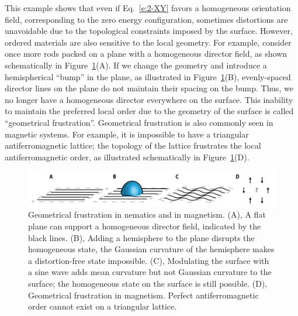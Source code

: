 This example shows that even if Eq.~\ref{e:2-XY} favors a homogeneous orientation field, corresponding to the zero energy configuration, sometimes distortions are unavoidable due to the topological constraints imposed by the surface.
However, ordered materials are also sensitive to the local geometry.
For example, consider once more rods packed on a plane with a homogeneous director field, as shown schematically in Figure~\ref{f:1-ParallelTransport}(A).
If we change the geometry and introduce a hemispherical ``bump'' in the plane, as illustrated in Figure~\ref{f:1-ParallelTransport}(B), evenly-spaced director lines on the plane do not maintain their spacing on the bump.
Thus, we no longer have a homogeneous director everywhere on the surface.
This inability to maintain the preferred local order due to the geometry of the surface is called ``geometrical frustration''.
Geometrical frustration is also commonly seen in magnetic systems.
For example, it is impossible to have a triangular antiferromagnetic lattice; the topology of the lattice frustrates the local antiferromagnetic order, as illustrated schematically in Figure~\ref{f:1-ParallelTransport}(D).
\begin{figure}
  \centering
  \includegraphics{figures/C1/Ch1-Figs_ParallelTransport.png}
  \caption{Geometrical frustration in nematics and in magnetism.
  (A), A flat plane can support a homogeneous director field, indicated by the black lines.
  (B), Adding a hemisphere to the plane disrupts the homogeneous state, the Gaussian curvature of the hemisphere makes a distortion-free state impossible.
  (C), Modulating the surface with a sine wave adds mean curvature but not Gaussian curvature to the surface; the homogeneous state on the surface is still possible.
  (D), Geometrical frustration in magnetism. Perfect antiferromagnetic order cannot exist on a triangular lattice.}\label{f:1-ParallelTransport}
\end{figure}

